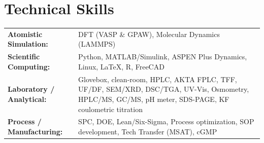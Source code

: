 \documentclass{article}
\begin{document}
\section{Technical Skills}
\begin{tabularx}{\textwidth}{@{}l X@{}}
\textbf{Atomistic Simulation:} & DFT (VASP \& GPAW), Molecular Dynamics (LAMMPS) \\ [3pt]
\textbf{Scientific Computing:} & Python, MATLAB/Simulink, ASPEN Plus Dynamics, Linux, LaTeX, R, FreeCAD \\ [3pt]
\textbf{Laboratory / Analytical:} & Glovebox, clean-room, HPLC, AKTA FPLC, TFF, UF/DF, SEM/XRD, DSC/TGA, UV-Vis, Osmometry, HPLC/MS, GC/MS, pH meter, SDS-PAGE, KF coulometric titration \\ [3pt]
\textbf{Process / Manufacturing:} & SPC, DOE, Lean/Six-Sigma, Process optimization, SOP development, Tech Transfer (MSAT), cGMP \\ [3pt]
\end{tabularx}
\end{document}
